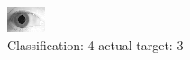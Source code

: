 \begin{figure}[h!]
\begin{center}
\includegraphics[width=0.60\columnwidth]{figures/ID1913_class_4_target_3.png}
\end{center}
\caption{ Classification: 4 actual target: 3}
\label{fig:ID1913_class_4_target_3}
\end{figure}
